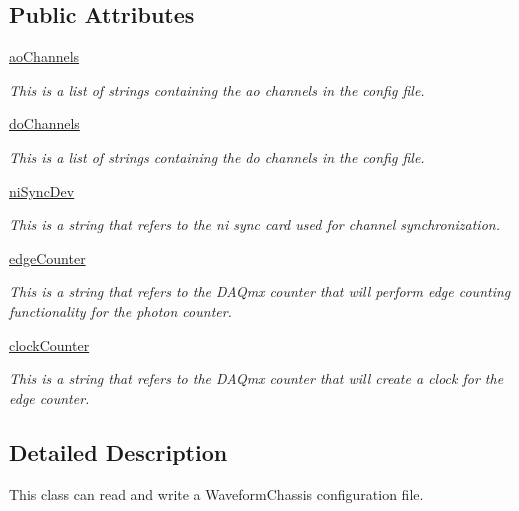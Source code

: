 \subsection*{Public Attributes}
\begin{DoxyCompactItemize}
\item 
\hyperlink{class_chassis_8git_1_1chassis_config_parser_1_1chassis_config_parser_aa0cadbc5a2dabc7ec503266ce91282c8}{ao\-Channels}
\begin{DoxyCompactList}\small\item\em This is a list of strings containing the ao channels in the config file. \end{DoxyCompactList}\item 
\hyperlink{class_chassis_8git_1_1chassis_config_parser_1_1chassis_config_parser_a9de4cc429f9dc26bf12adfb55aea4e62}{do\-Channels}
\begin{DoxyCompactList}\small\item\em This is a list of strings containing the do channels in the config file. \end{DoxyCompactList}\item 
\hyperlink{class_chassis_8git_1_1chassis_config_parser_1_1chassis_config_parser_afb537d5df40696da1456733f4f58071c}{ni\-Sync\-Dev}
\begin{DoxyCompactList}\small\item\em This is a string that refers to the ni sync card used for channel synchronization. \end{DoxyCompactList}\item 
\hyperlink{class_chassis_8git_1_1chassis_config_parser_1_1chassis_config_parser_af532aa2b066a478c55f7c525f4e76f2b}{edge\-Counter}
\begin{DoxyCompactList}\small\item\em This is a string that refers to the D\-A\-Qmx counter that will perform edge counting functionality for the photon counter. \end{DoxyCompactList}\item 
\hyperlink{class_chassis_8git_1_1chassis_config_parser_1_1chassis_config_parser_aedfd8adf268a65231021c9ad818ba252}{clock\-Counter}
\begin{DoxyCompactList}\small\item\em This is a string that refers to the D\-A\-Qmx counter that will create a clock for the edge counter. \end{DoxyCompactList}\end{DoxyCompactItemize}


\subsection{Detailed Description}
This class can read and write a Waveform\-Chassis configuration file. 



